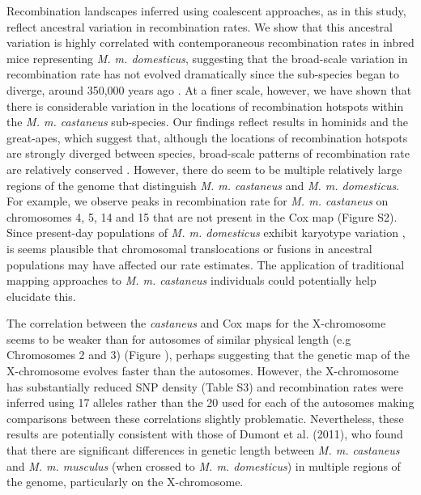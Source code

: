 Recombination landscapes inferred using coalescent approaches, as in this study, reflect ancestral variation in recombination rates. We show that this ancestral variation is highly correlated with contemporaneous recombination rates in inbred mice representing \emph{M. m. domesticus}, suggesting that the broad-scale variation in recombination rate has not evolved dramatically since the sub-species began to diverge, around 350,000 years ago \citep{RN315}. At a finer scale, however, we have shown that there is considerable variation in the locations of recombination hotspots within the \textit{M. m. castaneus} sub-species. Our findings reflect results in hominids and the great-apes, which suggest that, although the locations of recombination hotspots are strongly diverged between species, broad-scale patterns of recombination rate are relatively conserved \citep{RN222, RN221}. However, there do seem to be multiple relatively large regions of the genome that distinguish \textit{M. m. castaneus} and \emph{M. m. domesticus}. For example, we observe peaks in recombination rate for \emph{M. m. castaneus} on chromosomes 4, 5, 14 and 15 that are not present in the Cox map (Figure S2). Since present-day populations of \emph{M. m. domesticus} exhibit karyotype variation \citep{RN322}, is seems plausible that chromosomal translocations or fusions in ancestral populations may have affected our rate estimates. The application of traditional mapping approaches to \emph{M. m. castaneus} individuals could potentially help elucidate this.

The correlation between the \textit{castaneus} and Cox maps for the X-chromosome seems to be weaker than for autosomes of similar physical length (e.g Chromosomes 2 and 3) (Figure ), perhaps suggesting that the genetic map of the X-chromosome evolves faster than the autosomes. However, the X-chromosome has substantially reduced SNP density (Table S3) and recombination rates were inferred using 17 alleles rather than the 20 used for each of the autosomes making comparisons between these correlations slightly problematic. Nevertheless, these results are potentially consistent with those of Dumont et al. (2011), who found that there are significant differences in genetic length between \emph{M. m. castaneus} and \emph{M. m. musculus} (when crossed to \emph{M. m. domesticus}) in multiple regions of the genome, particularly on the X-chromosome.

